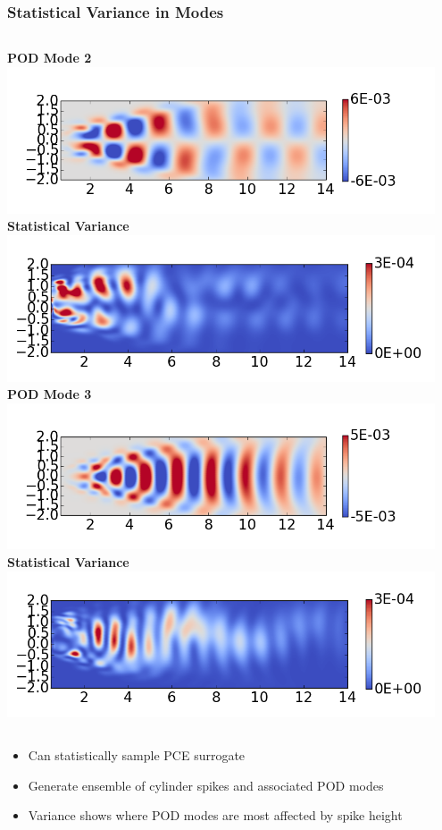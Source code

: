 \documentclass[9pt]{beamer}
\begin{document}
\begin{frame}
\frametitle{Statistical Variance in Modes}
\label{sec-3-5}

\begin{columns}[c]
\centering
\textbf{POD Mode 2} \\
\includegraphics[width=0.95\textwidth]{CylinderRe100POD2} \\
\textbf{Statistical Variance} \\
\includegraphics[width=0.95\textwidth]{VariancePOD2}
\centering
\textbf{POD Mode 3} \\
\includegraphics[width=0.95\textwidth]{CylinderRe100POD3} \\
\textbf{Statistical Variance} \\
\includegraphics[width=0.95\textwidth]{VariancePOD3}
\end{columns}
\begin{itemize}
\item Can statistically sample PCE surrogate
\item Generate ensemble of cylinder spikes and associated POD modes
\item Variance shows where POD modes are most affected by spike height
\end{itemize}
\end{frame}
\end{document}
